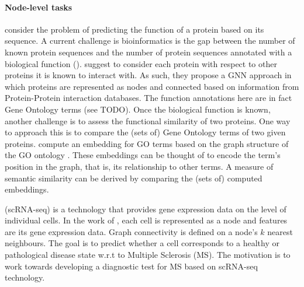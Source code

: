 \documentclass[
	fontsize=10pt, %
	twoside=false, %
	secnumdepth=1, %
  toc=indentunnumbered %
]{kaobook}
\begin{document}
\paragraph{Node-level tasks}
\citeauthor{you_DeepGraphGOGraphNeural_2021}
\cite{you_DeepGraphGOGraphNeural_2021} consider the problem of predicting the
function of a protein based on its sequence. A current challenge is
bioinformatics is the gap between the number of known protein sequences and the
number of protein sequences annotated with a biological function
(). \citeauthor{you_DeepGraphGOGraphNeural_2021}
suggest to consider each protein with respect to other proteins it is known to
interact with. As such, they propose a GNN approach in which proteins are
represented as nodes and connected based on information from Protein-Protein
interaction databases. The function annotations here are in fact Gene Ontology
terms (see TODO).
%
Once the biological function is known, another challenge is to assess the
functional similarity of two proteins. One way to approach this is to compare
the (sets of) Gene Ontology terms of two given proteins. 
\citeauthor{zhong_GO2VecTransformingGO_2020} compute an embedding for GO terms
based on the graph structure of the GO ontology
\cite{zhong_GO2VecTransformingGO_2020}.
These embeddings can be thought
of to encode the term's position in the graph, that is, its relationship to
other terms. A measure of semantic similarity can be derived by comparing the
(sets of) computed embeddings.

 (scRNA-seq) is a technology that provides gene
expression data on the level of individual cells. In the work of
\citeauthor{ravindra_disease_2020} \cite{ravindra_disease_2020}, each cell is
represented as a node and features are its gene expression data. Graph
connectivity is defined on a node's $k$ nearest neighbours. The goal is to
predict whether a cell corresponds to a healthy or pathological disease state
w.r.t to Multiple Sclerosis (MS). The motivation is to work towards developing a
diagnostic test for MS based on scRNA-seq technology.

\end{document}
